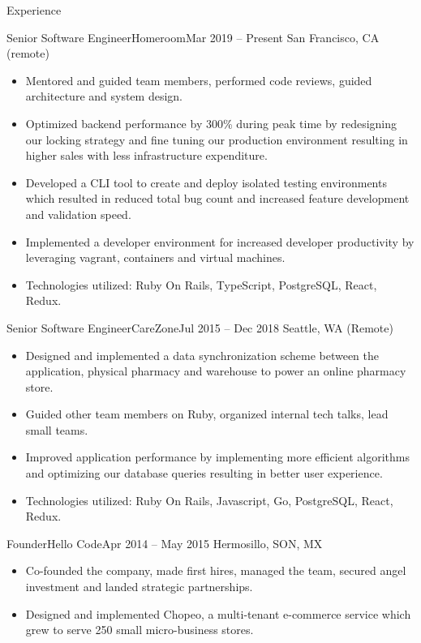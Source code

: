 \documentclass[calibri]{mcdowellcv}
\begin{document}
\begin{cvsection}{Experience}
\begin{cvsubsection}{Senior Software Engineer}{Homeroom}{Mar 2019 -- Present}
		San Francisco, CA (remote)
		\begin{itemize}%
			\item Mentored and guided team members, performed code reviews, guided architecture and system design.
			\item Optimized backend performance by 300\% during peak time by redesigning our locking strategy and fine tuning our production environment resulting in higher sales with less infrastructure expenditure.
			\item Developed a CLI tool to create and deploy isolated testing environments which resulted in reduced total bug count and increased feature development and validation speed.
			\item Implemented a developer environment for increased developer productivity by leveraging vagrant, containers and virtual machines.
			\item Technologies utilized: Ruby On Rails, TypeScript, PostgreSQL, React, Redux.
		\end{itemize}
	\end{cvsubsection}
	\vskip 0.3in
	\begin{cvsubsection}{Senior Software Engineer}{CareZone}{Jul 2015 -- Dec 2018}
		Seattle, WA (Remote)
		\begin{itemize}%
			\item Designed and implemented a data synchronization scheme between the application, physical pharmacy and warehouse to power an online pharmacy store.
			\item Guided other team members on Ruby, organized internal tech talks, lead small teams.
			\item Improved application performance by implementing more efficient algorithms and optimizing our database queries resulting in better user experience.
			\item Technologies utilized: Ruby On Rails, Javascript, Go, PostgreSQL, React, Redux.
		\end{itemize}
	\end{cvsubsection}
	\vskip 0.3in
	\begin{cvsubsection}{Founder}{Hello Code}{Apr 2014 -- May 2015}
		Hermosillo, SON, MX
		\begin{itemize}%
			\item Co-founded the company, made first hires, managed the team, secured angel investment and landed strategic partnerships.
			\item Designed and implemented Chopeo, a multi-tenant e-commerce service which grew to serve 250 small micro-business stores.

\end{itemize}
\end{cvsubsection}
\end{cvsection}
\end{document}
